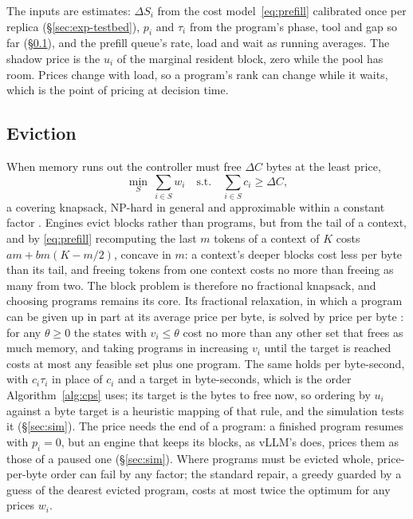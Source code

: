 \documentclass{article}
\newcommand{\leanref}[1]{}
\newcommand{\provedby}[1]{}
\theoremstyle{plain}
\theoremstyle{definition}
\theoremstyle{remark}
\begin{document}
The inputs are estimates: $\Delta S_i$ from the cost
model~\eqref{eq:prefill} calibrated once per replica
(\S\ref{sec:exp-testbed}), $p_i$ and $\tau_i$ from the program's phase,
tool and gap so far (\S\ref{sec:evict}), and the prefill queue's rate,
load and wait as running averages. The shadow price is the $u_i$ of the
marginal resident block, zero while the pool has room. Prices change
with load, so a program's rank can change while it
waits,\provedby{\leanref{price\_order\_flips\_with\_load}} which is the
point of pricing at decision time.

\subsection{Eviction}\label{sec:evict}

When memory runs out the controller must free $\Delta C$ bytes at the
least price,
\begin{equation}\label{eq:evict-priced}
  \min_{S}\ \sum_{i\in S}w_i \quad\text{s.t.}\quad \sum_{i\in S}c_i\ge\Delta C ,
\end{equation}
a covering knapsack, NP-hard in general and approximable within a
constant factor \citep{csirik1991,carnes2008}. Engines evict blocks
rather than programs, but from the tail of a context, and by
\eqref{eq:prefill} recomputing the last $m$ tokens of a context of $K$
costs $am+bm(K-m/2)$, concave in $m$: a context's deeper blocks cost
less per byte than its tail, and freeing tokens from one context costs
no more than freeing as many from two.\provedby{\leanref{tailRecompute\_marginal\_antitone}, \leanref{tailRecompute\_subadditive}}
The block problem is therefore no fractional knapsack, and choosing
programs remains its core. Its fractional relaxation, in which a program
can be given up in part at its average price per byte, is solved by
price per byte \citep{dantzig1957}: for any $\theta\ge0$ the states with
$v_i\le\theta$ cost no more than any other set that frees as much
memory, and taking programs in increasing $v_i$ until the target is
reached costs at most any feasible set plus one
program.\provedby{\leanref{threshold\_rule\_optimal}, \leanref{density\_prefix\_plus\_one}}
The same holds per byte-second, with $c_i\tau_i$ in place of $c_i$
and a target in byte-seconds,\provedby{\leanref{threshold\_rule\_optimal\_byte\_seconds}}
which is the order Algorithm~\ref{alg:cps} uses; its target is the
bytes to free now, so ordering by $u_i$ against a byte target is a
heuristic mapping of that rule, and the simulation tests it
(\S\ref{sec:sim}). The price needs the end of a program: a finished
program resumes with $p_i=0$, but an engine that keeps its blocks, as
vLLM's does, prices them as those of a paused one (\S\ref{sec:sim}). Where programs must be evicted whole,
price-per-byte order can fail by any factor; the standard repair, a
greedy guarded by a guess of the dearest evicted program, costs at most
twice the optimum \citep{csirik1991} for any prices $w_i$.\provedby{\leanref{densityFirst\_unbounded}, \leanref{threshold\_prefix\_le}, \leanref{guardedGreedy\_two\_approx}}
\end{document}
